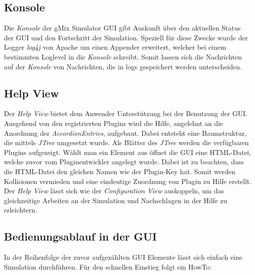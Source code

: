 \documentclass[a4paper, 11pt]{article} %
\begin{document}
\subsection{Konsole} %
\label{ssub:consoleview}
Die \emph{Konsole} der gMix Simulator GUI gibt Auskunft über den aktuellen Status der GUI und den Fortschritt der Simulation. Speziell für diese Zwecke wurde der Logger \emph{log4j} von Apache um einen Appender erweitert, welcher bei einem bestimmten Loglevel in die \emph{Konsole} schreibt. Somit lassen sich die Nachrichten auf der \emph{Konsole} von Nachrichten, die in logs gespeichert werden unterscheiden.

\subsection{Help View} %
\label{ssub:helpview}
Der \emph{Help View} bietet dem Anwender Unterstützung bei der Benutzung der GUI. Ausgehend von den registrierten Plugins wird die Hilfe, angelehnt an die Anordnung der \emph{AccordionEntries}, aufgebaut. Dabei entsteht eine Baumstruktur, die mittels \emph{JTree} umgesetzt wurde. Als Blätter des \emph{JTree} werden die verfügbaren Plugins aufgezeigt. Wählt man ein Element aus öffnet die GUI eine HTML-Datei, welche zuvor vom Pluginentwickler angelegt wurde. Dabei ist zu beachten, dass die HTML-Datei den gleichen Namen wie der Plugin-Key hat. Somit werden Kollisionen vermieden und eine eindeutige Zuordnung von Plugin zu Hilfe erstellt. Der \emph{Help View} lässt sich wie der \emph{Configuration View} auskoppeln, um das gleichzeitige Arbeiten an der Simulation und Nachschlagen in der Hilfe zu erleichtern.

\subsection{Bedienungsablauf in der GUI}
\label{ssub:bedienung}
In der Reihenfolge der zuvor aufgezählten GUI Elemente lässt sich einfach eine Simulation durchführen. Für den schnellen Einstieg folgt ein HowTo:
\end{document}
